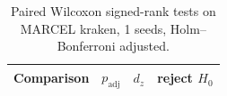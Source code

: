\begin{table}[t]
\centering
\small
\caption{Paired Wilcoxon signed-rank tests on MARCEL kraken, 1 seeds, Holm--Bonferroni adjusted.}
\label{tab:marcel_kraken_pw}
\begin{tabular}{lrrc}
\toprule
Comparison & $p_{\mathrm{adj}}$ & $d_z$ & reject $H_0$ \\
\midrule
\bottomrule
\end{tabular}
\end{table}
